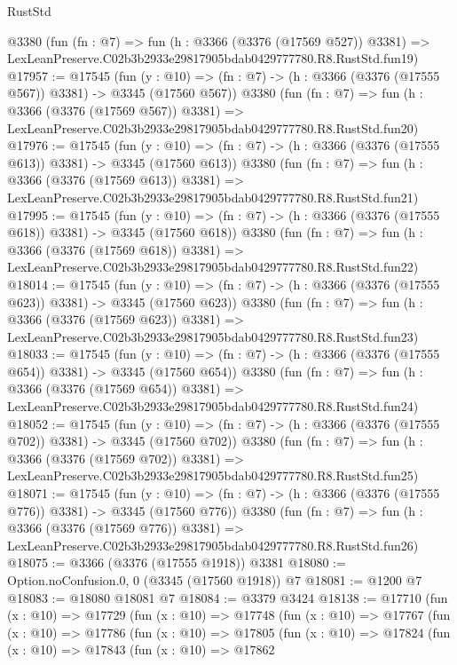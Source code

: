 \begin{lexlean}{RustStd}
\begin{coremodule}
    @3380
    (fun (fn : @7) =>
    fun (h : @3366 (@3376 (@17569 @527)) @3381) =>
    LexLeanPreserve.C02b3b2933e29817905bdab0429777780.R8.RustStd.fun19)
@17957 := @17545
    (fun (y : @10) => (fn : @7) -> (h : @3366 (@3376 (@17555 @567)) @3381) -> @3345 (@17560 @567))
    @3380
    (fun (fn : @7) =>
    fun (h : @3366 (@3376 (@17569 @567)) @3381) =>
    LexLeanPreserve.C02b3b2933e29817905bdab0429777780.R8.RustStd.fun20)
@17976 := @17545
    (fun (y : @10) => (fn : @7) -> (h : @3366 (@3376 (@17555 @613)) @3381) -> @3345 (@17560 @613))
    @3380
    (fun (fn : @7) =>
    fun (h : @3366 (@3376 (@17569 @613)) @3381) =>
    LexLeanPreserve.C02b3b2933e29817905bdab0429777780.R8.RustStd.fun21)
@17995 := @17545
    (fun (y : @10) => (fn : @7) -> (h : @3366 (@3376 (@17555 @618)) @3381) -> @3345 (@17560 @618))
    @3380
    (fun (fn : @7) =>
    fun (h : @3366 (@3376 (@17569 @618)) @3381) =>
    LexLeanPreserve.C02b3b2933e29817905bdab0429777780.R8.RustStd.fun22)
@18014 := @17545
    (fun (y : @10) => (fn : @7) -> (h : @3366 (@3376 (@17555 @623)) @3381) -> @3345 (@17560 @623))
    @3380
    (fun (fn : @7) =>
    fun (h : @3366 (@3376 (@17569 @623)) @3381) =>
    LexLeanPreserve.C02b3b2933e29817905bdab0429777780.R8.RustStd.fun23)
@18033 := @17545
    (fun (y : @10) => (fn : @7) -> (h : @3366 (@3376 (@17555 @654)) @3381) -> @3345 (@17560 @654))
    @3380
    (fun (fn : @7) =>
    fun (h : @3366 (@3376 (@17569 @654)) @3381) =>
    LexLeanPreserve.C02b3b2933e29817905bdab0429777780.R8.RustStd.fun24)
@18052 := @17545
    (fun (y : @10) => (fn : @7) -> (h : @3366 (@3376 (@17555 @702)) @3381) -> @3345 (@17560 @702))
    @3380
    (fun (fn : @7) =>
    fun (h : @3366 (@3376 (@17569 @702)) @3381) =>
    LexLeanPreserve.C02b3b2933e29817905bdab0429777780.R8.RustStd.fun25)
@18071 := @17545
    (fun (y : @10) => (fn : @7) -> (h : @3366 (@3376 (@17555 @776)) @3381) -> @3345 (@17560 @776))
    @3380
    (fun (fn : @7) =>
    fun (h : @3366 (@3376 (@17569 @776)) @3381) =>
    LexLeanPreserve.C02b3b2933e29817905bdab0429777780.R8.RustStd.fun26)
@18075 := @3366 (@3376 (@17555 @1918)) @3381
@18080 := Option.noConfusion.{0, 0} (@3345 (@17560 @1918)) @7
@18081 := @1200 @7
@18083 := @18080 @18081 @7
@18084 := @3379 @3424
@18138 := @17710
    (fun (x : @10) =>
    @17729
      (fun (x : @10) =>
      @17748
        (fun (x : @10) =>
        @17767
          (fun (x : @10) =>
          @17786
            (fun (x : @10) =>
            @17805
              (fun (x : @10) =>
              @17824
                (fun (x : @10) =>
                @17843
                  (fun (x : @10) =>
                  @17862

\end{coremodule}
\end{lexlean}
